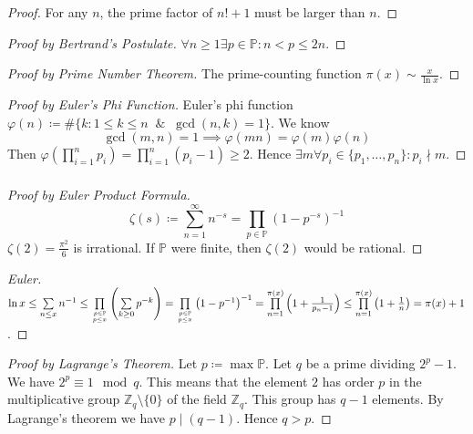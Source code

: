 \documentclass[UTF8,aspectratio=43,11pt,colorlinks,compress,openany]{beamer}%
\begin{document}
\begin{frame}\frametitle{}
\begin{proof}
For any $n$, the prime factor of $n!+1$ must be larger than $n$.
\end{proof}
\begin{proof}[Proof by Bertrand's Postulate]
$\forall n\geq 1\exists p\in\mathbb{P}: n<p\leq 2n$.
\end{proof}
\begin{proof}[Proof by Prime Number Theorem]
The prime-counting function $\pi(x)\sim\frac{x}{\ln x}$.
\end{proof}
\begin{proof}[Proof by Euler's Phi Function]
Euler's phi function $\varphi(n)\coloneqq \#\{k: 1\leq k\leq n\;\;\&\;\;\gcd(n,k)=1\}$. We know
\[\gcd(m,n)=1\implies\varphi(mn)=\varphi(m)\varphi(n)\]
Then $\varphi\left(\prod\limits_{i=1}^n p_i\right)=\prod\limits_{i=1}^n(p_i-1)\geq 2$. Hence $\exists m\forall p_i\in\{p_1,\dots,p_n\}: p_i\nmid m$.
\end{proof}
\end{frame}

\begin{frame}\frametitle{}
\begin{proof}[Proof by Euler Product Formula]
\[\zeta(s)\coloneqq \sum\limits_{n=1}^\infty n^{-s}=\prod\limits_{p\in\mathbb{P}}\left(1-p^{-s}\right)^{-1}\]
$\zeta(2)=\frac{\pi^2}{6}$ is irrational. If $\mathbb{P}$ were finite, then $\zeta(2)$ would be rational.
\end{proof}
\begin{proof}[Euler]
$\ln x\leq\sum\limits_{n\leq x} n^{-1}\leq \prod\limits_{p\in\mathbb{P}\atop{p\leq x}}\left(\sum\limits_{k\geq 0}p^{-k}\right)=\prod\limits_{p\in\mathbb{P}\atop{p\leq x}}\left(1-p^{-1}\right)^{-1}=\prod\limits_{n=1}^{\pi(x)}\left(1+\frac{1}{p_n-1}\right)\leq \prod\limits_{n=1}^{\pi(x)}\left(1+\frac{1}{n}\right)=\pi(x)+1$.
\end{proof}
\begin{proof}[Proof by Lagrange's Theorem]
Let $p\coloneqq \max\mathbb{P}$. Let $q$ be a prime dividing $2^p-1$. We have $2^p\equiv 1 \mod q$. This means that the element $2$ has order $p$ in the multiplicative group $\mathbb{Z}_q\setminus\{0\}$ of the field $\mathbb{Z}_q$. This group has $q-1$ elements. By Lagrange's theorem we have $p\mid(q-1)$. Hence $q>p$.
\end{proof}
\end{frame}
\end{document}
